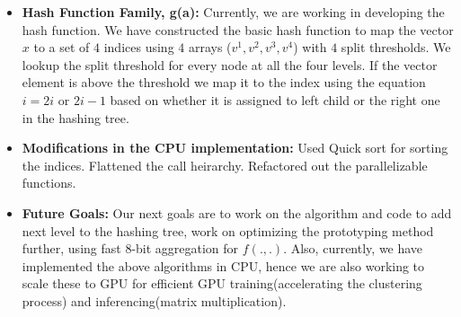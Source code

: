 \documentclass{article}
\begin{document}
\begin{itemize}
    \item \textbf{Hash Function Family, g(a):} Currently, we are working in developing the hash function. We have constructed the basic hash function to map the vector $x$ to a set of $4$ indices using $4$ arrays ($v^1, v^2, v^3, v^4$) with $4$ split thresholds. We lookup the split threshold for every node at all the four levels. If the vector element is above the threshold we map it to the index using the equation $i = 2i$ or $2i - 1$ based on whether it is assigned to left child or the right one in the hashing tree.
    \item \textbf{Modifications in the CPU implementation:} Used Quick sort for sorting the indices. Flattened the call heirarchy. Refactored out the parallelizable functions.  
    \item \textbf{Future Goals:} Our next goals are to work on the algorithm and code to add next level to the hashing tree, work on optimizing the prototyping method further, using fast 8-bit aggregation for $f(.,.)$. Also, currently, we have implemented the above algorithms in CPU, hence we are also working to scale these to GPU for efficient GPU training(accelerating the clustering process) and inferencing(matrix multiplication).  
\end{itemize}
\end{document}
